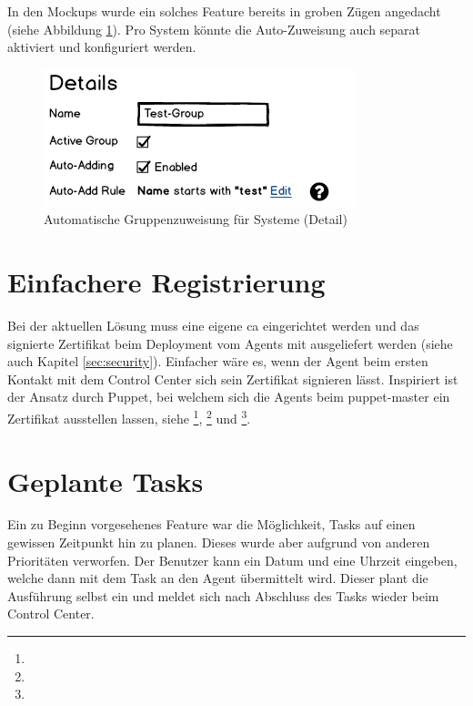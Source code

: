 In den Mockups wurde ein solches Feature bereits in groben Zügen angedacht (siehe Abbildung \ref{fig:ergebnis:group_systems_detail}). Pro System könnte die Auto-Zuweisung auch separat aktiviert und konfiguriert werden.

\begin{figure}
    \centering
    \includegraphics[width=0.5\linewidth]{files/mockups/group_systems_detail}
    \caption{Automatische Gruppenzuweisung für Systeme (Detail)}
    \label{fig:ergebnis:group_systems_detail}
\end{figure}

\section{Einfachere Registrierung} \label{sec:ausblick:simple_registration}

Bei der aktuellen Lösung muss eine eigene \gls{ca} eingerichtet werden und das signierte Zertifikat beim Deployment vom Agents mit ausgeliefert werden (siehe auch Kapitel \ref{sec:security}). Einfacher wäre es, wenn der Agent beim ersten Kontakt mit dem Control Center sich sein Zertifikat signieren lässt. Inspiriert ist der Ansatz durch Puppet, bei welchem sich die Agents beim puppet-master ein Zertifikat ausstellen lassen, siehe \footnote{}, \footnote{} und \footnote{}.

\section{Geplante Tasks} \label{sec:ausblick:scheduled_tasks}

Ein zu Beginn vorgesehenes Feature war die Möglichkeit, Tasks auf einen gewissen Zeitpunkt hin zu planen. Dieses wurde aber aufgrund von anderen Prioritäten verworfen. Der Benutzer kann ein Datum und eine Uhrzeit eingeben, welche dann mit dem Task an den Agent übermittelt wird. Dieser plant die Ausführung selbst ein und meldet sich nach Abschluss des Tasks wieder beim Control Center.

